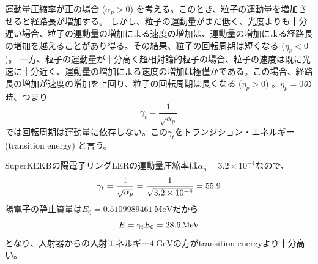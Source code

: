 \documentclass[10pt,a4paper]{ltjsarticle}
\begin{document}
運動量圧縮率が正の場合 ($\alpha_p>0$) を考える。このとき、粒子の運動量を増加させると経路長が増加する。 しかし、粒子の運動量がまだ低く、光度よりも十分遅い場合、粒子の運動量の増加による速度の増加は、運動量の増加による経路長の増加を越えることがあり得る。その結果、粒子の回転周期は短くなる ($\eta_p < 0$)。
一方、粒子の運動量が十分高く超相対論的粒子の場合、粒子の速度は既に光速に十分近く、運動量の増加による速度の増加は極僅かである。この場合、経路長の増加が速度の増加を上回り、粒子の回転周期は長くなる ($\eta_p>0$) 。$\eta_p = 0$の時、つまり
%
\begin{equation}
  \gamma_t = \frac{1}{\sqrt{\alpha_p}}
\end{equation}
%
では回転周期は運動量に依存しない。この$\gamma_t$をトランジション・エネルギー (transition energy) と言う。

\vspace{\baselineskip}

\begin{tcolorbox}[title=\textgt{SuperKEKB LERのtransition energy}]
  SuperKEKBの陽電子リングLERの運動量圧縮率は$\alpha_p = 3.2 \times 10^{-4}$なので、
  \begin{equation}
    \gamma_t = \frac{1}{\sqrt{\alpha_p}}= \frac{1}{\sqrt{3.2 \times 10^{-4}}} = 55.9 \notag
  \end{equation}
  陽電子の静止質量は$E_0 = \SI{0.5109989461}{\mega\electronvolt}$だから
  \begin{equation}
    E = \gamma_t E_0 = \SI{28.6}{\mega\electronvolt} \notag
  \end{equation}
  となり、入射器からの入射エネルギー$\SI{4}{\giga\electronvolt}$の方がtransition energyより十分高い。
\end{tcolorbox}
\end{document}
